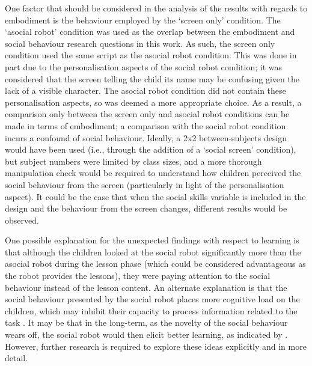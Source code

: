 One factor that should be considered in the analysis of the results with regards to embodiment is the behaviour employed by the `screen only' condition. The `asocial robot' condition was used as the overlap between the embodiment and social behaviour research questions in this work. As such, the screen only condition used the same script as the asocial robot condition. This was done in part due to the personalisation aspects of the social robot condition; it was considered that the screen telling the child its name may be confusing given the lack of a visible character. The asocial robot condition did not contain these personalisation aspects, so was deemed a more appropriate choice. As a result, a comparison only between the screen only and asocial robot conditions can be made in terms of embodiment; a comparison with the social robot condition incurs a confound of social behaviour. Ideally, a 2x2 between-subjects design would have been used (i.e., through the addition of a `social screen' condition), but subject numbers were limited by class sizes, and a more thorough manipulation check would be required to understand how children perceived the social behaviour from the screen (particularly in light of the personalisation aspect). It could be the case that when the social skills variable is included in the design and the behaviour from the screen changes, different results would be observed.

One possible explanation for the unexpected findings with respect to \gls{learning} is that although the children looked at the social robot significantly more than the asocial robot during the lesson phase (which could be considered advantageous as the robot provides the lessons), they were paying attention to the social behaviour instead of the lesson content. An alternate explanation is that the social behaviour presented by the social robot places more cognitive load on the children, which may inhibit their capacity to process information related to the task \citep{sweller1994cognitive}. It may be that in the long-term, as the novelty of the social behaviour wears off, the social robot would then elicit better \gls{learning}, as indicated by \citet{kanda2004interactive}. However, further research is required to explore these ideas explicitly and in more detail.

